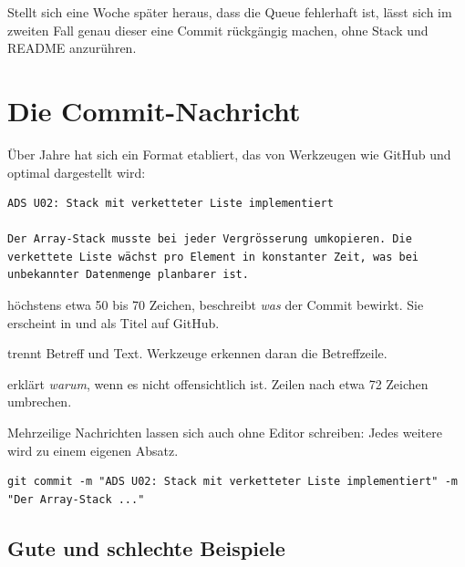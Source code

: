 Stellt sich eine Woche später heraus, dass die Queue fehlerhaft ist, lässt sich im
zweiten Fall genau dieser eine Commit rückgängig machen, ohne Stack und README anzurühren.

\section{Die Commit-Nachricht}

Über Jahre hat sich ein Format etabliert, das von Werkzeugen wie GitHub und 
optimal dargestellt wird:

\begin{lstlisting}[style=ausgabe]
ADS U02: Stack mit verketteter Liste implementiert

Der Array-Stack musste bei jeder Vergrösserung umkopieren. Die
verkettete Liste wächst pro Element in konstanter Zeit, was bei
unbekannter Datenmenge planbarer ist.
\end{lstlisting}

\begin{description}[style=nextline, leftmargin=1.2cm]
  \item[Betreffzeile] höchstens etwa 50 bis 70 Zeichen, beschreibt \emph{was} der Commit
    bewirkt. Sie erscheint in  und als Titel auf GitHub.
  \item[Leerzeile] trennt Betreff und Text. Werkzeuge erkennen daran die Betreffzeile.
  \item[Text (optional)] erklärt \emph{warum}, wenn es nicht offensichtlich ist.
    Zeilen nach etwa 72 Zeichen umbrechen.
\end{description}

Mehrzeilige Nachrichten lassen sich auch ohne Editor schreiben: Jedes weitere 
wird zu einem eigenen Absatz.

\begin{lstlisting}[style=befehle]
git commit -m "ADS U02: Stack mit verketteter Liste implementiert" -m "Der Array-Stack ..."
\end{lstlisting}

\subsection*{Gute und schlechte Beispiele}

